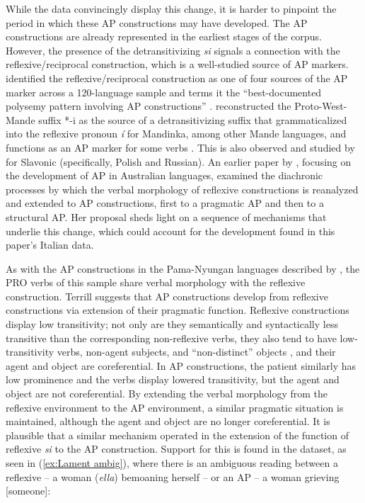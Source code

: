 \documentclass[output=paper,colorlinks,citecolor=brown]{langscibook}
\begin{document}
While the data convincingly display this change, it is harder to pinpoint the period in which these AP constructions may have developed. The AP constructions are already represented in the earliest stages of the corpus. However, the presence of the detransitivizing \textit{si} signals a connection with the reflexive/reciprocal construction, which is a well-studied source of AP markers.  \citet{sanso_where_2017, sanso_sources_2019} identified the reflexive/reciprocal construction as one of four sources of the AP marker across a 120-language sample and terms it the ``best-documented polysemy pattern involving AP constructions” \citeyearpar[193]{sanso_where_2017}. \citet{creissels_origin_2012} reconstructed the Proto-West-Mande suffix *-i as the source of a detransitivizing suffix that grammaticalized into the reflexive pronoun \textit{í} for Mandinka, among other Mande languages, and functions as an AP marker for some verbs \citeyearpar[15]{creissels_origin_2012}. This is also observed and studied by \citet{janic_slavonic_2013} for Slavonic (specifically, Polish and Russian). An earlier paper by \citet{terrill_development_1997}, focusing on the development of AP in Australian languages, examined the diachronic processes by which the verbal morphology of reflexive constructions is reanalyzed and extended to AP constructions, first to a pragmatic AP and then to a structural AP. Her proposal sheds light on a sequence of mechanisms that underlie this change, which could account for the development found in this paper’s Italian data.

As with the AP constructions in the Pama-Nyungan languages described by \citep{terrill_development_1997}, the PRO verbs of this sample share verbal morphology with the reflexive construction. Terrill suggests that AP constructions develop from reflexive constructions via extension of their pragmatic function. Reflexive constructions display low transitivity; not only are they semantically and syntactically less transitive than the corresponding non-reflexive verbs, they also tend to have low-transitivity verbs, non-agent subjects, and ``non-distinct'' objects \citep[81]{terrill_development_1997}, and their agent and object are coreferential. In AP constructions, the patient similarly has low prominence and the verbs display lowered transitivity, but the agent and object are not coreferential. By extending the verbal morphology from the reflexive environment to the AP environment, a similar pragmatic situation is maintained, although the agent and object are no longer coreferential. It is plausible that a similar mechanism operated in the extension of the function of reflexive \textit{si} to the AP construction. Support for this is found in the dataset, as seen in (\ref{ex:Lament ambig}), where there is an ambiguous reading between a reflexive -- a woman (\textit{ella}) bemoaning herself -- or an AP -- a woman grieving [someone]:
\end{document}
